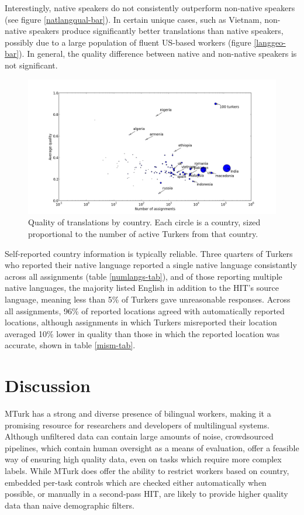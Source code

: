 \documentclass[11pt]{article}
\begin{document}
Interestingly, native speakers do not consistently outperform non-native speakers (see figure \ref{natlangqual-bar}). In certain unique cases, such as Vietnam, non-native speakers produce significantly better translations than native speakers, possibly due to a large population of fluent US-based workers (figure \ref{langgeo-bar}). In general, the quality difference between native and non-native speakers is not significant.	


\begin{figure}[h]
\centering
\includegraphics[width=6in]{figures/quality-scatter-avgturkers-country-labeled}
\caption{Quality of translations by country. Each circle is a country, sized proportional to the number of active Turkers from that country.}
\label{quality-scatter}
\end{figure}

Self-reported country information is typically reliable. Three quarters of Turkers who reported their native language reported a single native language consistantly across all assignments (table \ref{numlangs-tab}), and of those reporting multiple native languages, the majority listed English in addition to the HIT's source language, meaning less than 5\% of Turkers gave unreasonable responses. Across all assignments, 96\% of reported locations agreed with automatically reported locations, although assignments in which Turkers misreported their location averaged 10\% lower in quality than those in which the reported location was accurate, shown in table \ref{mism-tab}.


\section{Discussion}
MTurk has a strong and diverse presence of bilingual workers, making it a promising resource for researchers and developers of multilingual systems. Although unfiltered data can contain large amounts of noise, crowdsourced pipelines, which contain human oversight as a means of evaluation, offer a feasible way of ensuring high quality data, even on tasks which require more complex labels. While MTurk does offer the ability to restrict workers based on country, embedded per-task controls which are checked either automatically when possible, or manually in a second-pass HIT, are likely to provide higher quality data than naive demographic filters. 
\end{document}
